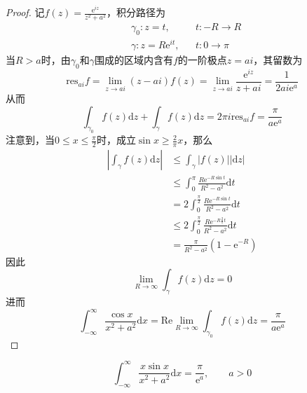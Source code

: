 \documentclass[lang = cn, scheme = chinese, thmcnt = section]{elegantbook}
\begin{document}
\begin{proof}
	记$f(z)=\frac{\mathrm{e}^{iz}}{z^2+a^2}$，积分路径为
	\begin{align*}
		& \gamma_0:z=t,&& t:-R\to R\\
		& \gamma:z=R\mathrm{e}^{it},&& t:0\to\pi
	\end{align*}
	当$R>a$时，由$\gamma_0$和$\gamma$围成的区域内含有$f$的一阶极点$z=ai$，其留数为
	$$
	\mathrm{res}_{ai}f=\lim_{z\to ai}(z-ai)f(z)=\lim_{z\to ai}\frac{\mathrm{e}^{iz}}{z+ai}=\frac{1}{2ai\mathrm{e}^{a}}
	$$
	从而
	$$
	\int_{\gamma_0}f(z)\mathrm{d}z+\int_{\gamma}f(z)\mathrm{d}z=2\pi i \mathrm{res}_{ai}f=\frac{\pi}{a\mathrm{e}^a}
	$$
	注意到，当$0\le x\le \frac{\pi }{2}$时，成立$\sin x\ge \frac{2}{\pi }x$，那么
	\begin{align*}
		\left| \int_{\gamma}{f(z)\mathrm{d}z} \right|
		& \le\int_\gamma{|f(z)||\mathrm{d}z|}\\
		& \le\int_0^\pi \frac{R\mathrm{e}^{-R\sin t}}{R^2-a^2}\mathrm{d}t\\
		& =2\int_0^\frac{\pi}{2} \frac{R\mathrm{e}^{-R\sin t}}{R^2-a^2}\mathrm{d}t\\
		& \le2\int_0^\frac{\pi}{2} \frac{R\mathrm{e}^{-R\frac{2}{\pi}t}}{R^2-a^2}\mathrm{d}t\\
		& =\frac{\pi}{R^2-a^2}(1-\mathrm{e}^{-R})
	\end{align*}
	因此
	$$
	\lim_{R\to\infty}\int_{\gamma}f(z)\mathrm{d}z=0
	$$
	进而
	$$
	\int_{-\infty}^{\infty}\frac{\cos x}{x^2+a^2}\mathrm{d}x=\text{Re}\lim_{R\to\infty}\int_{\gamma_0}f(z)\mathrm{d}z=\frac{\pi}{a\mathrm{e}^a}
	$$
\end{proof}

\begin{example}
	$$
	\int_{-\infty}^{\infty}\frac{x\sin x}{x^2+a^2}\mathrm{d}x=\frac{\pi}{\mathrm{e}^a},\qquad a>0
	$$
\end{example}
\end{document}
